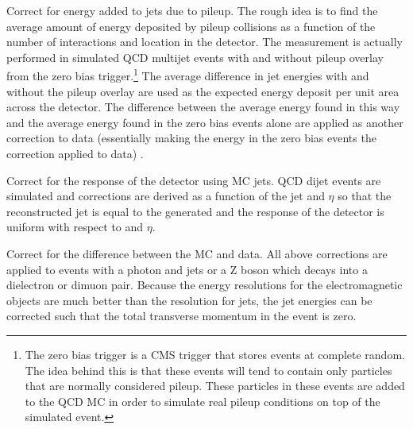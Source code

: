     \begin{enumerate}
       Correct for energy added to jets due to pileup. The rough idea is to find the average amount of energy deposited by pileup collisions as a function of the number of interactions and location in the detector. The measurement is actually performed in simulated QCD multijet events with and without pileup overlay from the zero bias trigger.\footnote{The zero bias trigger is a CMS trigger that stores events at complete random. The idea behind this is that these events will tend to contain only particles that are normally considered pileup. These particles in these events are added to the QCD MC in order to simulate real pileup conditions on top of the simulated event.} The average difference in jet energies with and without the pileup overlay are used as the expected energy deposit per unit area across the detector. The difference between the average energy found in this way and the average energy found in the zero bias events alone are applied as another correction to data (essentially making the energy in the zero bias events the correction applied to data) .\cite[sec. 6.2]{jetmet_2011} ~\cite[sec. 4]{JEC_2016}

       Correct for the response of the detector using MC jets. QCD dijet events are simulated and corrections are derived as a function of the jet \pt and $\eta$ so that the reconstructed jet \pt is equal to the generated \pt and the response of the detector is uniform with respect to \pt and $\eta$.\cite[sec. 6.3]{jetmet_2011} ~\cite[sec. 5]{JEC_2016}

       Correct for the difference between the MC and data. All above corrections are applied to events with a photon and jets or a Z boson which decays into a dielectron or dimuon pair. Because the energy resolutions for the electromagnetic objects are much better than the resolution for jets, the jet energies can be corrected such that the total transverse momentum in the event is zero.\cite[sec. 6.3]{jetmet_2011} ~\cite[sec. 6]{JEC_2016}
    \end{enumerate}

